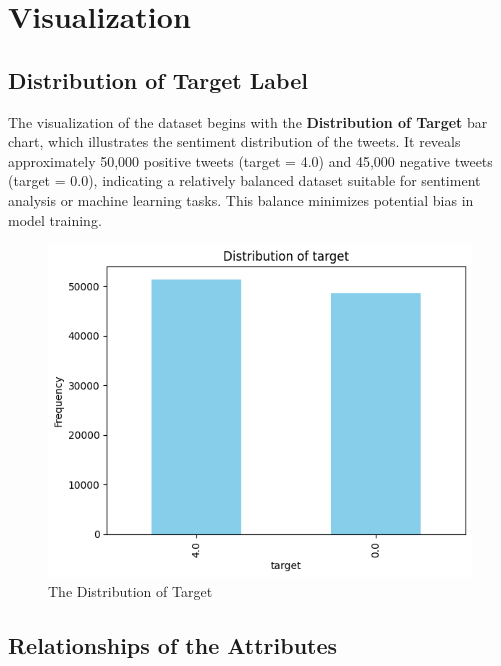 \section{Visualization}

\subsection{Distribution of Target Label}

The visualization of the dataset begins with the \textbf{Distribution of Target} bar chart, which illustrates the sentiment distribution of the tweets. It reveals approximately 50,000 positive tweets (target = 4.0) and 45,000 negative tweets (target = 0.0), indicating a relatively balanced dataset suitable for sentiment analysis or machine learning tasks. This balance minimizes potential bias in model training.

\begin{figure}[H]
    \centering
    \includegraphics[width=\textwidth]{img/visualize_pic/distribution.png}
    \caption{The Distribution of Target}
\end{figure}

\subsection{Relationships of the Attributes}

